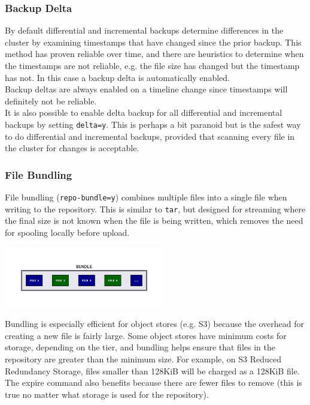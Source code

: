 \begin{frame}[fragile]
    \frametitle{Backup Delta}

    By default differential and incremental backups determine differences in the cluster by examining timestamps that have changed since the prior backup. This method has proven reliable over time, and there are heuristics to determine when the timestamps are not reliable, e.g. the file size has changed but the timestamp has not. In this case a backup delta is automatically enabled.
    \\\vspace{1em}
    Backup deltas are always enabled on a timeline change since timestamps will definitely not be reliable.
    \\\vspace{1em}
    It is also possible to enable delta backup for all differential and incremental backups by setting \texttt{delta=y}. This is perhaps a bit paranoid but is the safest way to do differential and incremental backups, provided that scanning every file in the cluster for changes is acceptable.
\end{frame}

\begin{frame}[fragile]
    \frametitle{File Bundling}

    File bundling (\texttt{repo-bundle=y}) combines multiple files into a single file when writing to the repository. This is similar to \texttt{tar}, but designed for streaming where the final size is not known when the file is being written, which removes the need for spooling locally before upload.

    \includegraphics[width=\linewidth,height=100px]{svg/bundle.png}

    Bundling is especially efficient for object stores (e.g. S3) because the overhead for creating a new file is fairly large. Some object stores have minimum costs for storage, depending on the tier, and bundling helps ensure that files in the repository are greater than the minimum size. For example, on S3 Reduced Redundancy Storage, files smaller than 128KiB will be charged as a 128KiB file.
    \\\vspace{1em}
    The expire command also benefits because there are fewer files to remove (this is true no matter what storage is used for the repository).
\end{frame}


